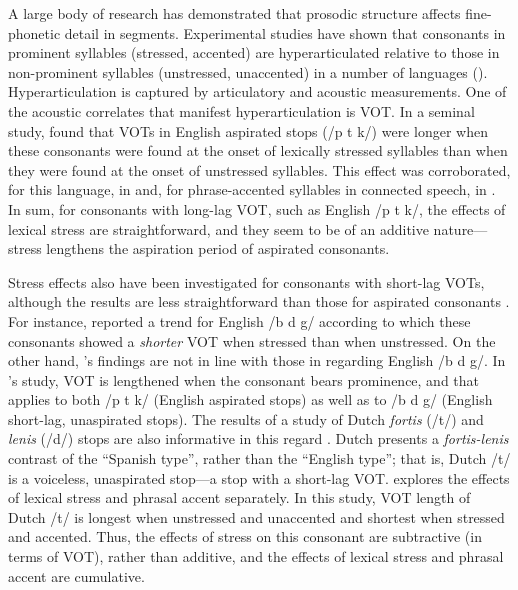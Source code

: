 \documentclass[a4paper]{article}
\begin{document}
A large body of research has demonstrated that prosodic structure affects fine-phonetic detail in segments. Experimental studies have shown that consonants in prominent syllables (stressed, accented) are hyperarticulated relative to those in non-prominent syllables (unstressed, unaccented) in a number of languages (\cite[among others]{cho2009effects, cho2005prosodic, Cole:2003uq, de-Jong-Ken:1995fk, Abramson:1967fk}). Hyperarticulation is captured by articulatory and acoustic measurements. One of the acoustic correlates that manifest hyperarticulation is VOT. In a seminal study, \cite{Abramson:1967fk} found that VOTs in English aspirated stops (/p t k/) were longer when these consonants were found at the onset of lexically stressed syllables than when they were found at the onset of unstressed syllables. This effect was corroborated, for this language, in \cite{cho2009effects} and, for phrase-accented syllables in connected speech, in \cite{Cole:2003uq}. In sum, for consonants with long-lag VOT, such as English /p t k/, the effects of lexical stress are straightforward, and they seem to be of an additive nature---stress lengthens the aspiration period of aspirated consonants.

Stress effects also have been investigated for consonants with short-lag VOTs, although the results are less straightforward than those for aspirated consonants \cite{Castaneda:1986eu, Poch:1985bv, Troya:2005hh}. For instance, \cite{Abramson:1967fk} reported a trend for English /b d g/ according to which these consonants showed a \emph{shorter} VOT when stressed than when unstressed. On the other hand, \cite{Cole:2003uq}'s findings are not in line with those in \cite{Abramson:1967fk} regarding English /b d g/. In \cite{Cole:2003uq}'s study, VOT is lengthened when the consonant bears prominence, and that applies to both /p t k/ (English aspirated stops) as well as to /b d g/ (English short-lag, unaspirated stops). The results of a study of Dutch \emph{fortis} (/t/) and \emph{lenis} (/d/) stops are also informative in this regard \cite{cho2005prosodic}. Dutch presents a \emph{fortis-lenis} contrast of the ``Spanish type'', rather than the ``English type''; that is, Dutch /t/ is a voiceless, unaspirated stop---a stop with a short-lag VOT. \cite{cho2005prosodic} explores the effects of lexical stress and phrasal accent separately. In this study, VOT length of Dutch /t/ is longest when unstressed and unaccented and shortest when stressed and accented. Thus, the effects of stress on this consonant are subtractive (in terms of VOT), rather than additive, and the effects of lexical stress and phrasal accent are cumulative.
\end{document}
